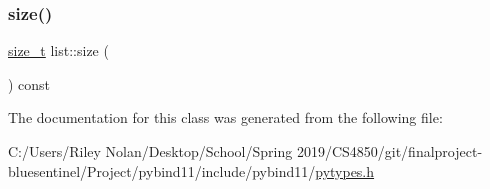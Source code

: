 \mbox{\label{classlist_a8fcc9151a36f5802b0ec7d42a0b592f6}} 
\subsubsection{\texorpdfstring{size()}{size()}}
{\footnotesize\ttfamily \mbox{\hyperlink{detail_2common_8h_a801d6a451a01953ef8cbae6feb6a3638}{size\+\_\+t}} list\+::size (\begin{DoxyParamCaption}{ }\end{DoxyParamCaption}) const\hspace{0.3cm}{\ttfamily [inline]}}



The documentation for this class was generated from the following file\+:\begin{DoxyCompactItemize}
\item 
C\+:/\+Users/\+Riley Nolan/\+Desktop/\+School/\+Spring 2019/\+C\+S4850/git/finalproject-\/bluesentinel/\+Project/pybind11/include/pybind11/\mbox{\hyperlink{pytypes_8h}{pytypes.\+h}}\end{DoxyCompactItemize}

